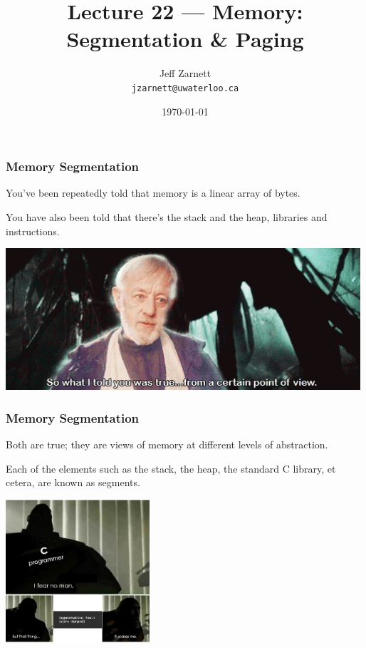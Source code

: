 

\title{Lecture 22 --- Memory: Segmentation \& Paging }

\author{Jeff Zarnett \\ \small \texttt{jzarnett@uwaterloo.ca}}
\date{\today}




\begin{frame}
  \titlepage

 \end{frame}



\begin{frame}
\frametitle{Memory Segmentation}

You've been repeatedly told that memory is a linear array of bytes. 

You have also been told that there's the stack and the heap, libraries and instructions.

\begin{center}
	\includegraphics[width=\textwidth]{images/pov.jpg}
\end{center}

 \end{frame}



\begin{frame}
\frametitle{Memory Segmentation}

Both are true; they are views of memory at different levels of abstraction. 

Each of the elements such as the stack, the heap, the standard C library, et cetera, are known as \alert{segments}.

\begin{center}
	\includegraphics[width=0.4\textwidth]{images/segfault.png}
\end{center}


\end{frame}

